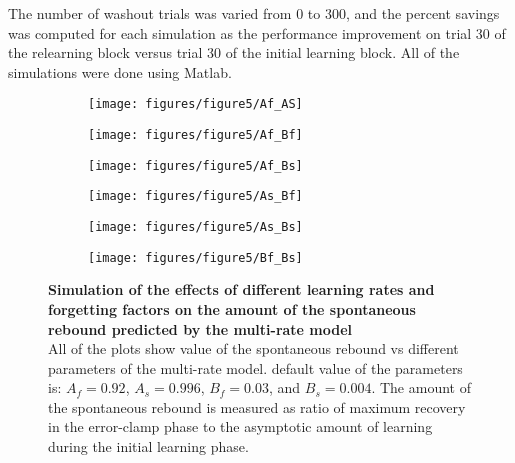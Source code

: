 \documentclass[9pt,twocolumn]{paper-template}
\begin{document}
The number of washout trials was varied from 0 to 300, and the percent savings was computed for each simulation as the performance improvement on trial 30 of the relearning block versus trial 30 of the initial learning block. All of the simulations were done using Matlab.

\begin{figure}[h!]
  \centering
  \begin{subfigure}[b]{0.32\linewidth}
    \texttt{[image: figures/figure5/Af\_AS]}
  \end{subfigure}
  \begin{subfigure}[b]{0.32\linewidth}
    \texttt{[image: figures/figure5/Af\_Bf]}
  \end{subfigure}
   \begin{subfigure}[b]{0.32\linewidth}
    \texttt{[image: figures/figure5/Af\_Bs]}
  \end{subfigure}
    \begin{subfigure}[b]{0.32\linewidth}
    \texttt{[image: figures/figure5/As\_Bf]}
  \end{subfigure}
  \begin{subfigure}[b]{0.32\linewidth}
    \texttt{[image: figures/figure5/As\_Bs]}
  \end{subfigure}
   \begin{subfigure}[b]{0.32\linewidth}
    \texttt{[image: figures/figure5/Bf\_Bs]}
  \end{subfigure}
  \caption{\textbf{Simulation of the effects of different learning rates and forgetting factors on the amount of the spontaneous rebound predicted by the multi-rate model}\\
  All of the plots show value of the spontaneous rebound vs different parameters of the multi-rate model. default value of the parameters is: $A_f=0.92$, $A_s=0.996$, $B_f=0.03$, and $B_s=0.004$. The amount of the spontaneous rebound is measured as ratio of maximum recovery in the error-clamp phase to the asymptotic amount of learning during the initial learning phase. 
}
  \label{fig:mutli_rate_params}
\end{figure}
\end{document}

